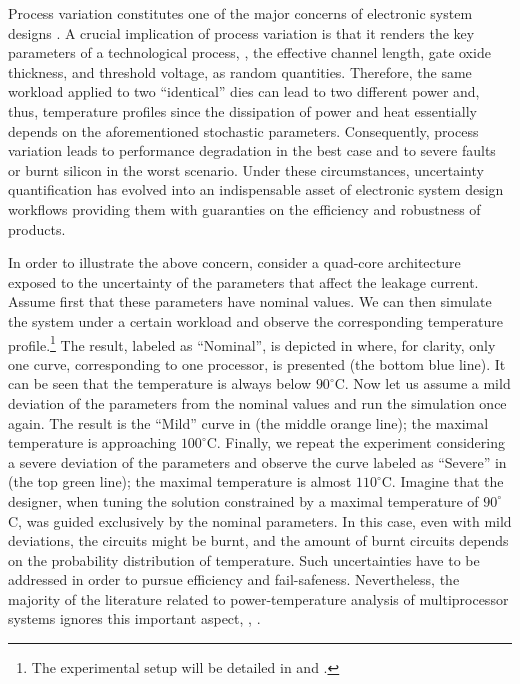 
Process variation constitutes one of the major concerns of electronic system designs \cite{chandrakasan2001, srivastava2010}.
A crucial implication of process variation is that it renders the key parameters of a technological process, \eg, the effective channel length, gate oxide thickness, and threshold voltage, as random quantities.
Therefore, the same workload applied to two ``identical'' dies can lead to two different power and, thus, temperature profiles since the dissipation of power and heat essentially depends on the aforementioned stochastic parameters.
Consequently, process variation leads to performance degradation in the best case and to severe faults or burnt silicon in the worst scenario.
Under these circumstances, uncertainty quantification \cite{xiu2010, maitre2010} has evolved into an indispensable asset of electronic system design workflows providing them with guaranties on the efficiency and robustness of products.

In order to illustrate the above concern, consider a quad-core architecture exposed to the uncertainty of the parameters that affect the leakage current.
Assume first that these parameters have nominal values.
We can then simulate the system under a certain workload and observe the corresponding temperature profile.\footnote{The experimental setup will be detailed in  and .}
The result, labeled as ``Nominal'', is depicted in  where, for clarity, only one curve, corresponding to one processor, is presented (the bottom blue line). It can be seen that the temperature is always below $90^{\circ}$C.
Now let us assume a mild deviation of the parameters from the nominal values and run the simulation once again. The result is the ``Mild'' curve in  (the middle orange line); the maximal temperature is approaching $100^{\circ}$C.
Finally, we repeat the experiment considering a severe deviation of the parameters and observe the curve labeled as ``Severe'' in  (the top green line); the maximal temperature is almost $110^{\circ}$C.
Imagine that the designer, when tuning the solution constrained by a maximal temperature of $90^\circ$C, was guided exclusively by the nominal parameters.
In this case, even with mild deviations, the circuits might be burnt, and the amount of burnt circuits depends on the probability distribution of temperature.
Such uncertainties have to be addressed in order to pursue efficiency and fail-safeness.
Nevertheless, the majority of the literature related to power-temperature analysis of multiprocessor systems ignores this important aspect, \eg, \cite{rao2009, rai2011, thiele2011, ukhov2012}.

